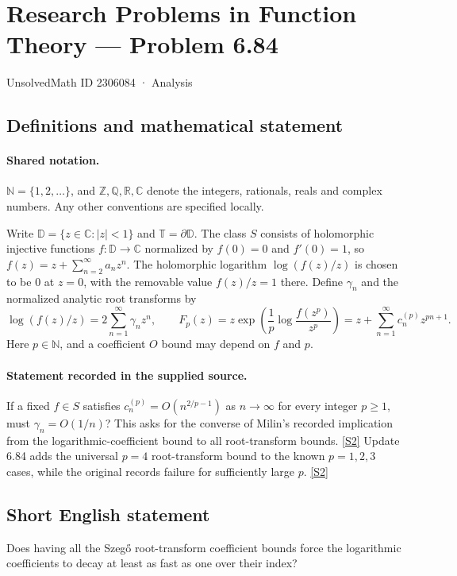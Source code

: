 \documentclass[11pt]{article}
\newcommand{\sref}[2]{\hyperlink{source:#1:#2}{[S#2]}}
\begin{document}
\setcounter{section}{2306083}
\section{Research Problems in Function Theory — Problem 6.84}\label{2306084}
{\small\sffamily UnsolvedMath ID 2306084 · Analysis}
\subsection{Definitions and mathematical statement}

\paragraph{Shared notation.}$\mathbb N=\{1,2,\ldots\}$, and $\mathbb Z,\mathbb Q,\mathbb R,\mathbb C$ denote the integers, rationals, reals and complex numbers. Any other conventions are specified locally.


Write $\mathbb D=\{z\in\mathbb C:|z|<1\}$ and $\mathbb T=\partial\mathbb D$. The class $S$ consists of holomorphic injective functions $f:\mathbb D\to\mathbb C$ normalized by $f(0)=0$ and $f'(0)=1$, so $f(z)=z+\sum_{n=2}^{\infty}a_nz^n$. The holomorphic logarithm $\log(f(z)/z)$ is chosen to be $0$ at $z=0$, with the removable value $f(z)/z=1$ there. Define $\gamma_n$ and the normalized analytic root transforms by \[\log(f(z)/z)=2\sum_{n=1}^{\infty}\gamma_nz^n,\qquad F_p(z)=z\exp\!\left(\frac1p\log\frac{f(z^p)}{z^p}\right)=z+\sum_{n=1}^{\infty}c_n^{(p)}z^{pn+1}.\] Here $p\in\mathbb N$, and a coefficient $O$ bound may depend on $f$ and $p$.
\paragraph{Statement recorded in the supplied source.}
If a fixed $f\in S$ satisfies $c_n^{(p)}=O(n^{2/p-1})$ as $n\to\infty$ for every integer $p\ge1$, must $\gamma_n=O(1/n)$? This asks for the converse of Milin's recorded implication from the logarithmic-coefficient bound to all root-transform bounds. \sref{2306084}{2}
Update 6.84 adds the universal $p=4$ root-transform bound to the known $p=1,2,3$ cases, while the original records failure for sufficiently large $p$. \sref{2306084}{2}
\subsection{Short English statement}
Does having all the Szegő root-transform coefficient bounds force the logarithmic coefficients to decay at least as fast as one over their index?
\end{document}
